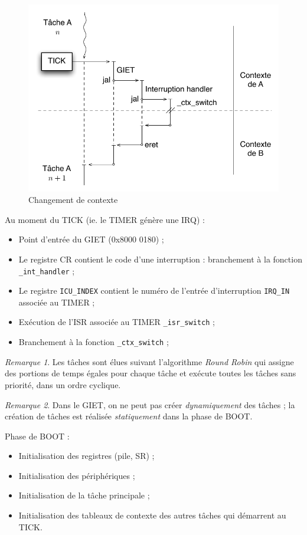 \documentclass[11pt,english,french]{scrreprt}
\theoremstyle{remark}
\newtheorem*{rem*}{Remarque}
\theoremstyle{definition}
\begin{document}
\begin{figure}[!h]
	\center
	\includegraphics[scale=.75]{diagrammes/ctx_switch}
	\caption{Changement de contexte}
\end{figure}

Au moment du TICK (ie. le TIMER génère une IRQ) :\begin{itemize}
	\item Point d'entrée du GIET (0x8000 0180) ;
	\item Le registre CR contient le code d'une interruption : branchement à la fonction \lstinline!_int_handler! ;
	\item Le registre \lstinline!ICU_INDEX! contient le numéro de l'entrée d'interruption \lstinline!IRQ_IN!  associée au TIMER ;
	\item Exécution de l'ISR associée au TIMER \lstinline!_isr_switch! ;
	\item Branchement à la fonction \lstinline!_ctx_switch! ;
\end{itemize}

\begin{rem*}
	Les tâches sont élues suivant l'algorithme \emph{Round Robin} qui assigne des portions de temps égales pour chaque tâche et exécute toutes les tâches sans priorité, dans un ordre cyclique. 
\end{rem*}

\begin{rem*}
	Dans le GIET, on ne peut pas créer \emph{dynamiquement} des tâches ; la création de tâches est réalisée \emph{statiquement} dans la phase de BOOT.
	
	Phase de BOOT :\begin{itemize}
		\item Initialisation des registres (pile, SR) ;
		\item Initialisation des périphériques ;
		\item Initialisation de la tâche principale ;
		\item Initialisation des tableaux de contexte des autres tâches qui démarrent au TICK.
	\end{itemize}
\end{rem*}
\end{document}
